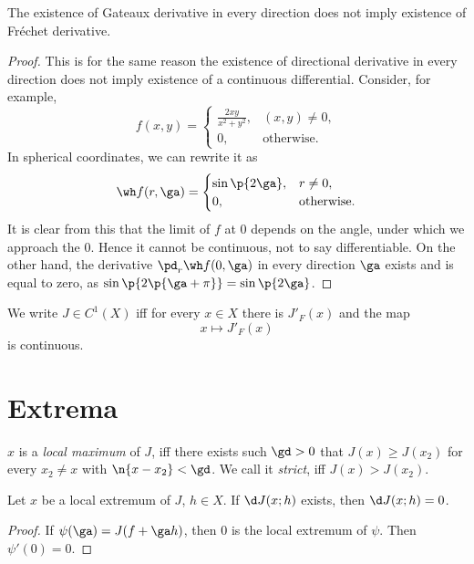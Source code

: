 \begin{statement}
  The existence of Gateaux derivative in every direction does not imply existence of Fréchet derivative.
\end{statement}

\begin{proof}
  This is for the same reason the existence of directional derivative in every direction does not imply existence of a continuous differential.
  Consider, for example,
  $$
  f(x, y) =
  \begin{cases}
    \frac{2xy}{x^2 +y^2}, & (x, y) \ne 0, \\
    0, & \text{otherwise}.
  \end{cases}
  $$
  In spherical coordinates, we can rewrite it as
  $$
  \wh f(r, \ga) =
  \begin{cases}
    \sin\p{2\ga}, & r \ne 0, \\
    0, & \text{otherwise}.
  \end{cases}
  $$
  It is clear from this that the limit of $f$ at $0$ depends on the angle, under which we approach the $0$. Hence it cannot be continuous, not to say differentiable.
  On the other hand, the derivative $\pd_r \wh f(0, \ga)$ in every direction $\ga$ exists and is equal to zero, as $\sin\p{2\p{\ga+\pi}}=\sin\p{2\ga}$.
\end{proof}

\begin{definition}
  We write $J \in C^1(X)$ iff for every $x \in X$ there is $J'_F(x)$ and the map 
  $$ x \mapsto J'_F(x) $$
  is continuous.
\end{definition}

\section{Extrema}

\begin{definition}
  $x$ is a \emph{local maximum} of $J$, iff there exists such $\gd > 0$ that $J(x) \ge J(x_2)$ for every $x_2 \ne x$ with $\n{x-x_2} < \gd$.
  We call it \emph{strict}, iff $J(x) > J(x_2)$.
\end{definition}

\begin{lemma}
  Let $x$ be a local extremum of $J$, $h \in X$.
  If $\d J(x; h)$ exists, then $\d J(x; h) = 0$.
\end{lemma}

\begin{proof}
  If $\psi(\ga) = J(f+\ga h)$, then $0$ is the local extremum of $\psi$.
  Then $\psi'(0) = 0.$
\end{proof}

